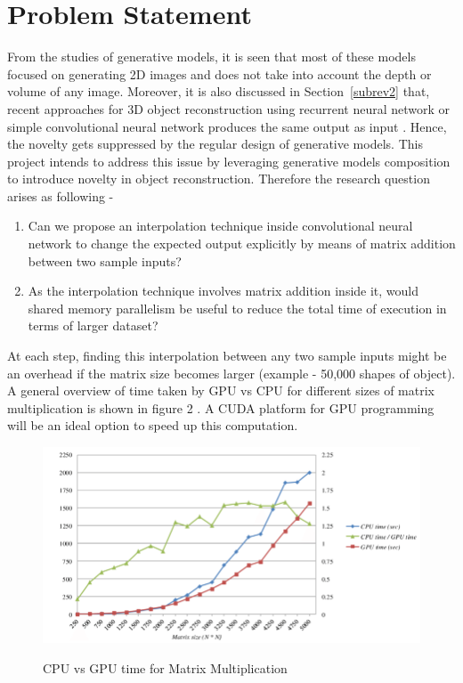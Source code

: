 \documentclass[11pt]{article}       %
\begin{document}
\section{Problem Statement} \label{problemStatement}
From the studies of generative models, it is seen that most of these models focused on generating 2D images and does not take into account the depth or volume of any image. Moreover, it is also discussed in Section~\ref{subrev2} that, recent approaches for 3D object reconstruction using recurrent neural network \cite{dr7} or simple convolutional neural network \cite{dr2} produces the same output as input . Hence, the novelty gets suppressed by the regular design of generative models. This project intends to address this issue by leveraging generative models composition to introduce novelty in object reconstruction. Therefore the research question arises as following -     
\begin{enumerate}
\item Can we propose an interpolation technique inside convolutional neural network to change the expected output explicitly by means of matrix addition between two sample inputs?
\item As the interpolation technique involves matrix addition inside it, would shared memory parallelism be useful to reduce the total time of execution in terms of larger dataset?
\end{enumerate}
At each step, finding this interpolation between any two sample inputs might be an overhead if the matrix size becomes larger (example - 50,000 shapes of object). A general overview of time taken by GPU vs CPU for different sizes of matrix multiplication is shown in figure 2 \cite{latcharote2013high}. A CUDA platform for GPU programming will be an ideal option to speed up this computation.  
\begin{figure}[h]
\begin{center}
\includegraphics[scale=0.4]{time.png}
\caption{CPU vs GPU time for Matrix Multiplication}\cite{latcharote2013high}
\end{center}
\end{figure}
\end{document}
